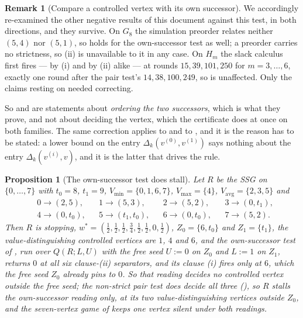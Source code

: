 \documentclass[11pt]{article}
\theoremstyle{plain}
\newtheorem{proposition}[theorem]{Proposition}
\theoremstyle{definition}
\newtheorem{remark}[theorem]{Remark}
\newcommand{\Vmax}{V_{\max}}
\newcommand{\Vmin}{V_{\min}}
\newcommand{\Vavg}{V_{\mathrm{avg}}}
\begin{document}
\begin{remark}[Compare a controlled vertex with its own successor]
We accordingly re-examined the other negative results of this document against
this test, in both directions, and they survive. On $G_8$ the simulation
preorder relates neither $(5,4)$ nor $(5,1)$, so 
holds for the own-successor test as well; a preorder carries no strictness, so
(ii) is unavailable to it in any case. On $H_m$ the slack calculus first fires
--- by (i) and by (ii) alike --- at rounds $15,39,101,250$ for $m=3,\dots,6$,
exactly one round after the pair test's $14,38,100,249$, so
 is unaffected. Only the claims resting on
 needed correcting.

So  and  are statements
about \emph{ordering the two successors}, which is what they prove, and not
about deciding the vertex, which the certificate does at once on both families.
The same correction applies to  and to
, and it is the reason
 has to be stated: a lower bound on the
entry $\Delta_k(v^{(0)},v^{(1)})$ says nothing about the entry
$\Delta_k(v^{(i)},v)$, and it is the latter that drives the rule.
\end{remark}

\begin{proposition}[The own-successor test does stall]\label{prop:own-stall}
Let $R$ be the SSG on $\{0,\dots,7\}$ with $t_0=8$, $t_1=9$,
$\Vmin=\{0,1,6,7\}$, $\Vmax=\{4\}$, $\Vavg=\{2,3,5\}$ and
\[
  \begin{aligned}
   &0\to(2,5), &&1\to(5,3), &&2\to(5,2), &&3\to(0,t_1),\\
   &4\to(0,t_0), &&5\to(t_1,t_0), &&6\to(0,t_0), &&7\to(5,2).
  \end{aligned}
\]
Then $R$ is stopping,
$w^\ast=(\tfrac12,\tfrac12,\tfrac12,\tfrac34,\tfrac12,\tfrac12,0,\tfrac12)$,
$Z_0=\{6,t_0\}$ and $Z_1=\{t_1\}$, the value-distinguishing controlled vertices
are $1$, $4$ and $6$, and the own-successor test of ,
run over $Q(R;L,U)$ with the free seed $U:=0$ on $Z_0$ and $L:=1$ on $Z_1$,
returns $0$ at all six clause-(ii) separators, and its clause (i) fires only
at $6$, which the free seed $Z_0$ already pins to $0$. So that reading decides
no controlled vertex outside the free seed; the non-strict pair test does
decide all three (), so $R$ stalls the own-successor
reading only, at its two value-distinguishing vertices outside $Z_0$, and the
seven-vertex game of  keeps one vertex silent under both
readings.
\end{proposition}
\end{document}
